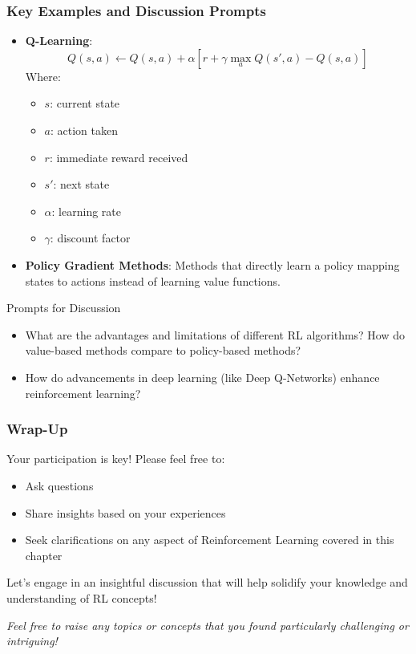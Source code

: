 \documentclass[aspectratio=169]{beamer}
\begin{document}
\begin{frame}[fragile]
    \frametitle{Key Examples and Discussion Prompts}
    \begin{itemize}
        \item \textbf{Q-Learning}:
        \begin{equation}
            Q(s, a) \leftarrow Q(s, a) + \alpha \left[ r + \gamma \max_a Q(s', a) - Q(s, a) \right]
        \end{equation}
        Where:
        \begin{itemize}
            \item $s$: current state
            \item $a$: action taken
            \item $r$: immediate reward received
            \item $s'$: next state
            \item $\alpha$: learning rate
            \item $\gamma$: discount factor
        \end{itemize}
        
        \item \textbf{Policy Gradient Methods}: Methods that directly learn a policy mapping states to actions instead of learning value functions.
    \end{itemize}
    
    \begin{block}{Prompts for Discussion}
        \begin{itemize}
            \item What are the advantages and limitations of different RL algorithms? How do value-based methods compare to policy-based methods?
            \item How do advancements in deep learning (like Deep Q-Networks) enhance reinforcement learning?
        \end{itemize}
    \end{block}
\end{frame}

\begin{frame}[fragile]
    \frametitle{Wrap-Up}
    Your participation is key! Please feel free to:
    \begin{itemize}
        \item Ask questions
        \item Share insights based on your experiences
        \item Seek clarifications on any aspect of Reinforcement Learning covered in this chapter
    \end{itemize}
    
    Let's engage in an insightful discussion that will help solidify your knowledge and understanding of RL concepts!
    
    \textit{Feel free to raise any topics or concepts that you found particularly challenging or intriguing!}
\end{frame}
\end{document}
